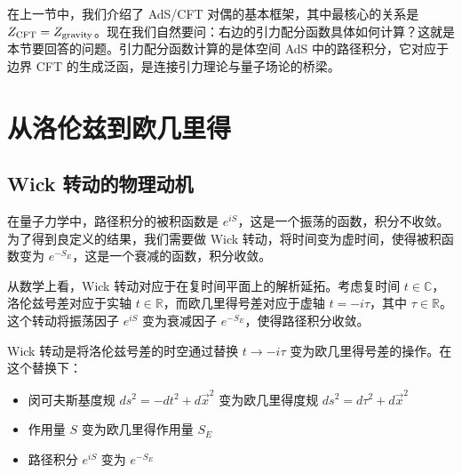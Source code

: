 
在上一节中，我们介绍了 AdS/CFT 对偶的基本框架，其中最核心的关系是 $Z_{\rm CFT} = Z_{\rm gravity}$。现在我们自然要问：右边的引力配分函数具体如何计算？这就是本节要回答的问题。引力配分函数计算的是体空间 AdS 中的路径积分，它对应于边界 CFT 的生成泛函，是连接引力理论与量子场论的桥梁。

\section{从洛伦兹到欧几里得}

\subsection{Wick 转动的物理动机}

在量子力学中，路径积分的被积函数是 $e^{iS}$，这是一个振荡的函数，积分不收敛。为了得到良定义的结果，我们需要做 Wick 转动，将时间变为虚时间，使得被积函数变为 $e^{-S_E}$，这是一个衰减的函数，积分收敛。

从数学上看，Wick 转动对应于在复时间平面上的解析延拓。考虑复时间 $t \in \mathbb{C}$，洛伦兹号差对应于实轴 $t \in \mathbb{R}$，而欧几里得号差对应于虚轴 $t = -i\tau$，其中 $\tau \in \mathbb{R}$。这个转动将振荡因子 $e^{iS}$ 变为衰减因子 $e^{-S_E}$，使得路径积分收敛。

\begin{definition}[Wick 转动]
Wick 转动是将洛伦兹号差的时空通过替换 $t \to -i\tau$ 变为欧几里得号差的操作。在这个替换下：
\begin{itemize}
    \item 闵可夫斯基度规 $ds^2 = -dt^2 + d\vec{x}^2$ 变为欧几里得度规 $ds^2 = d\tau^2 + d\vec{x}^2$
    \item 作用量 $S$ 变为欧几里得作用量 $S_E$
    \item 路径积分 $e^{iS}$ 变为 $e^{-S_E}$
\end{itemize}
\end{definition}

